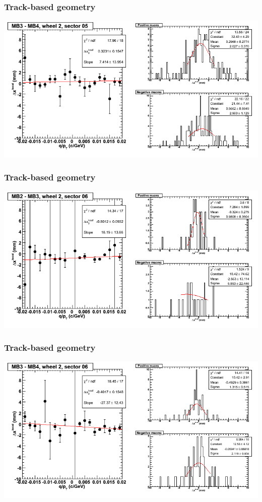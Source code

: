 \documentclass[compress]{beamer}
\begin{document}
\begin{frame}
\frametitle{Track-based geometry}
\includegraphics[width=\linewidth]{NOV4_segdiffs/dt13_resid_E_05_34.png}
\end{frame}

\begin{frame}
\frametitle{Track-based geometry}
\includegraphics[width=\linewidth]{NOV4_segdiffs/dt13_resid_E_06_23.png}
\end{frame}

\begin{frame}
\frametitle{Track-based geometry}
\includegraphics[width=\linewidth]{NOV4_segdiffs/dt13_resid_E_06_34.png}
\end{frame}
\end{document}
